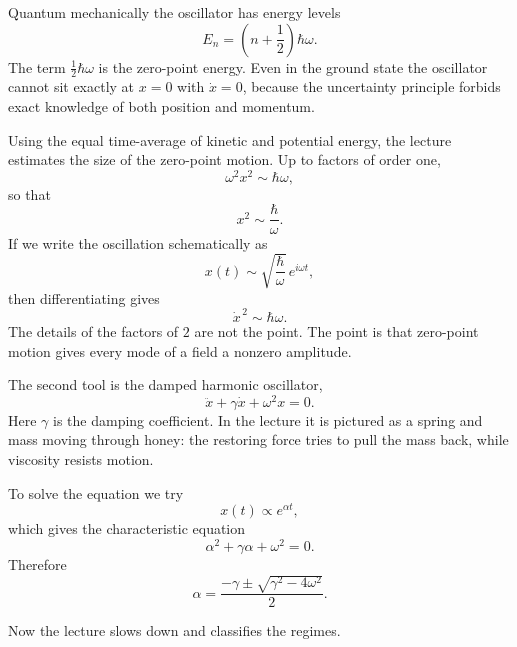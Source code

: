 Quantum mechanically the oscillator has energy levels
\begin{equation}
E_{n}=\left(n+\frac12\right)\hbar\omega.
\end{equation}
The term \(\tfrac12\hbar\omega\) is the zero-point energy. Even in the ground state the oscillator cannot sit exactly at \(x=0\) with \(\dot x=0\), because the uncertainty principle forbids exact knowledge of both position and momentum.

Using the equal time-average of kinetic and potential energy, the lecture estimates the size of the zero-point motion. Up to factors of order one,
\begin{equation}
\omega^{2}x^{2}\sim \hbar\omega,
\end{equation}
so that
\begin{equation}
x^{2}\sim \frac{\hbar}{\omega}.
\end{equation}
If we write the oscillation schematically as
\begin{equation}
x(t)\sim \sqrt{\frac{\hbar}{\omega}}\,e^{i\omega t},
\end{equation}
then differentiating gives
\begin{equation}
\dot x^{\,2}\sim \hbar\omega.
\end{equation}
The details of the factors of \(2\) are not the point. The point is that zero-point motion gives every mode of a field a nonzero amplitude.

The second tool is the damped harmonic oscillator,
\begin{equation}
\ddot x+\gamma\dot x+\omega^{2}x=0.
\end{equation}
Here \(\gamma\) is the damping coefficient. In the lecture it is pictured as a spring and mass moving through honey: the restoring force tries to pull the mass back, while viscosity resists motion.

To solve the equation we try
\begin{equation}
x(t)\propto e^{\alpha t},
\end{equation}
which gives the characteristic equation
\begin{equation}
\alpha^{2}+\gamma\alpha+\omega^{2}=0.
\end{equation}
Therefore
\begin{equation}
\alpha=\frac{-\gamma\pm\sqrt{\gamma^{2}-4\omega^{2}}}{2}.
\end{equation}

Now the lecture slows down and classifies the regimes.

